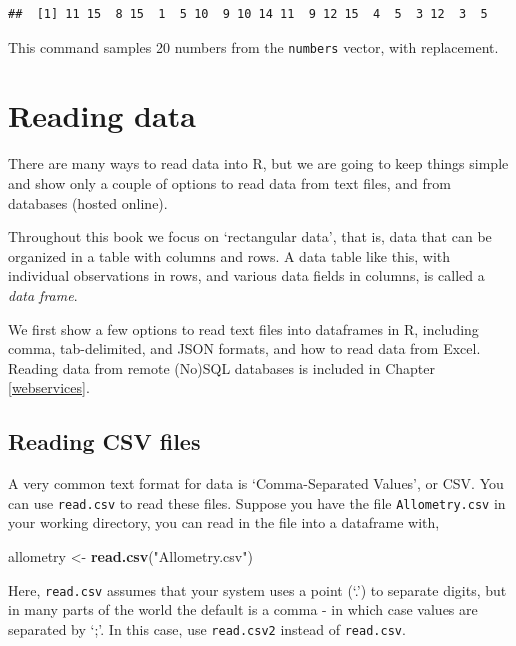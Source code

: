 \documentclass[]{book}
\newenvironment{Shaded}{\begin{snugshade}}{\end{snugshade}}
\newcommand{\KeywordTok}[1]{\textcolor[rgb]{0.13,0.29,0.53}{\textbf{#1}}}
\newcommand{\NormalTok}[1]{#1}
\newcommand{\StringTok}[1]{\textcolor[rgb]{0.31,0.60,0.02}{#1}}
\begin{document}
\begin{verbatim}
##  [1] 11 15  8 15  1  5 10  9 10 14 11  9 12 15  4  5  3 12  3  5
\end{verbatim}

This command samples 20 numbers from the \texttt{numbers} vector, with replacement.

\hypertarget{readingdata}{%
\section{Reading data}\label{readingdata}}

There are many ways to read data into R, but we are going to keep things simple and show only a couple of options to read data from text files, and from databases (hosted online).

Throughout this book we focus on `rectangular data', that is, data that can be organized in a table with columns and rows. A data table like this, with individual observations in rows, and various data fields in columns, is called a \emph{data frame}.

We first show a few options to read text files into dataframes in R, including comma, tab-delimited, and JSON formats, and how to read data from Excel. Reading data from remote (No)SQL databases is included in Chapter \ref{webservices}.

\hypertarget{readcsv}{%
\subsection{Reading CSV files}\label{readcsv}}

A very common text format for data is `Comma-Separated Values', or CSV. You can use \texttt{read.csv} to read these files. Suppose you have the file \texttt{Allometry.csv} in your working directory, you can read in the file into a dataframe with,

\begin{Shaded}
\begin{Highlighting}[]
\NormalTok{allometry <-}\StringTok{ }\KeywordTok{read.csv}\NormalTok{(}\StringTok{"Allometry.csv"}\NormalTok{)}
\end{Highlighting}
\end{Shaded}

Here, \texttt{read.csv} assumes that your system uses a point (`.') to separate digits, but in many parts of the world the default is a comma - in which case values are separated by `;'. In this case, use \texttt{read.csv2} instead of \texttt{read.csv}.
\end{document}
